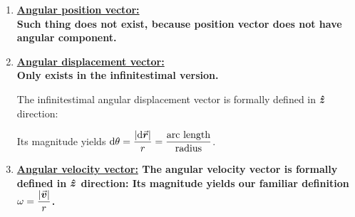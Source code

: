 \documentclass[class=article, crop=false, 12pt]{standalone}
\begin{document}
\begin{enumerate}
    \item \bf{\ul{Angular position vector:}}\\
    Such thing does not exist, 
    because position vector does not have angular component. 
    
    \item \bf{\ul{Angular displacement vector:}}\\
    Only exists in the infinitestimal version.

    The infinitestimal angular displacement vector is formally defined in $\vu*{z}$ direction:
    
    Its magnitude yields $\displaystyle \dd{\theta} = \frac{\abs{\dd{\va*{r}}}}{r} = \frac{\text{arc length}}{\text{radius}}$.
    
    \item \bf{\ul{Angular velocity vector:}}
    The angular velocity vector is formally defined in $\vu*{z}$ direction:
    Its magnitude yields our familiar definition $\displaystyle \omega = \frac{\abs{\va*{v}}}{r}$.
    

\end{enumerate}
\end{document}
